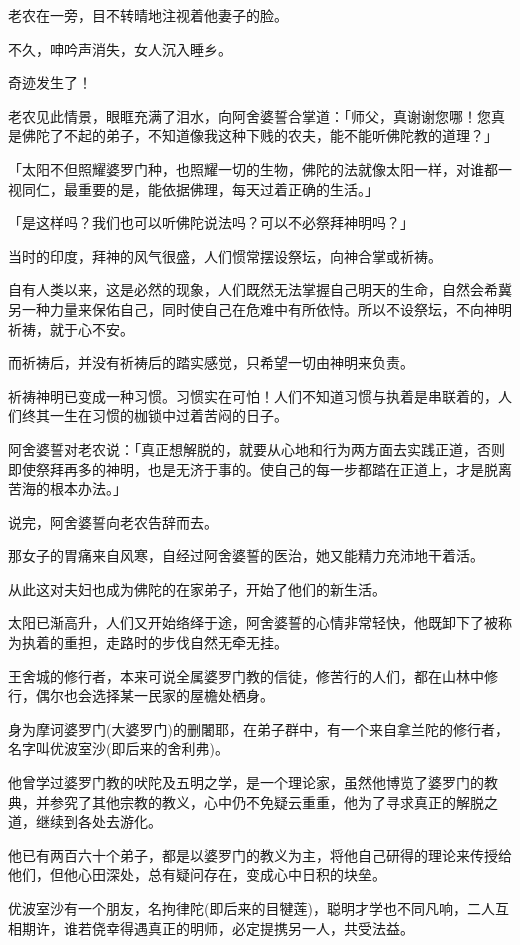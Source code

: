 \documentclass[twoside,openany]{book}
\begin{document}
老农在一旁，目不转晴地注视着他妻子的脸。

不久，呻吟声消失，女人沉入睡乡。

奇迹发生了！

老农见此情景，眼眶充满了泪水，向阿舍婆誓合掌道：「师父，真谢谢您哪！您真是佛陀了不起的弟子，不知道像我这种下贱的农夫，能不能听佛陀教的道理？」

「太阳不但照耀婆罗门种，也照耀一切的生物，佛陀的法就像太阳一样，对谁都一视同仁，最重要的是，能依据佛理，每天过着正确的生活。」

「是这样吗？我们也可以听佛陀说法吗？可以不必祭拜神明吗？」

当时的印度，拜神的风气很盛，人们惯常摆设祭坛，向神合掌或祈祷。

自有人类以来，这是必然的现象，人们既然无法掌握自己明天的生命，自然会希冀另一种力量来保佑自己，同时使自己在危难中有所依恃。所以不设祭坛，不向神明祈祷，就于心不安。

而祈祷后，并没有祈祷后的踏实感觉，只希望一切由神明来负责。

祈祷神明已变成一种习惯。习惯实在可怕！人们不知道习惯与执着是串联着的，人们终其一生在习惯的枷锁中过着苦闷的日子。

阿舍婆誓对老农说：「真正想解脱的，就要从心地和行为两方面去实践正道，否则即使祭拜再多的神明，也是无济于事的。使自己的每一步都踏在正道上，才是脱离苦海的根本办法。」

说完，阿舍婆誓向老农告辞而去。

那女子的胃痛来自风寒，自经过阿舍婆誓的医治，她又能精力充沛地干着活。

从此这对夫妇也成为佛陀的在家弟子，开始了他们的新生活。

太阳已渐高升，人们又开始络绎于途，阿舍婆誓的心情非常轻快，他既卸下了被称为执着的重担，走路时的步伐自然无牵无挂。

王舍城的修行者，本来可说全属婆罗门教的信徒，修苦行的人们，都在山林中修行，偶尔也会选择某一民家的屋檐处栖身。

身为摩诃婆罗门(大婆罗门)的删闍耶，在弟子群中，有一个来自拿兰陀的修行者，名字叫优波室沙(即后来的舍利弗)。

他曾学过婆罗门教的吠陀及五明之学，是一个理论家，虽然他博览了婆罗门的教典，并参究了其他宗教的教义，心中仍不免疑云重重，他为了寻求真正的解脱之道，继续到各处去游化。

他已有两百六十个弟子，都是以婆罗门的教义为主，将他自己研得的理论来传授给他们，但他心田深处，总有疑问存在，变成心中日积的块垒。

优波室沙有一个朋友，名拘律陀(即后来的目犍莲)，聪明才学也不同凡响，二人互相期许，谁若侥幸得遇真正的明师，必定提携另一人，共受法益。
\end{document}
